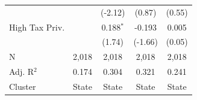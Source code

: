 \begin{tabular*}{\textwidth}{@{\extracolsep{\fill}}lcccc}
                              &               & (-2.12)        & (0.87)       & (0.55)\\   
   High Tax Priv.             &               & 0.188$^{*}$    & -0.193        & 0.005\\   
                              &               & (1.74)         & (-1.66)       & (0.05)\\   
   \hline
   N               & 2,018         & 2,018          & 2,018         & 2,018\\  
   Adj. R$^2$             & 0.174         & 0.304          & 0.321         & 0.241\\  
   Cluster              & State & State & State & State\\  
   \bottomrule
\end{tabular*}
\par\endgroup
